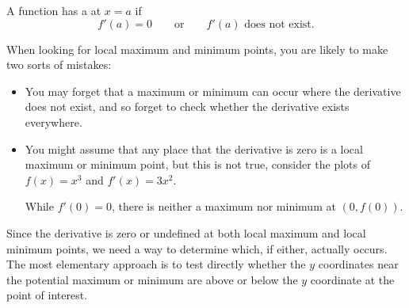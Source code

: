 \documentclass{ximera}
\begin{document}
\begin{definition}
  A function has a  at $x=a$ if 
  \[
  f'(a) = 0\qquad\text{or}\qquad \text{$f'(a)$ does not exist.}
  \]
\end{definition}

\begin{warning} 
When looking for local maximum and minimum points, you are likely to
make two sorts of mistakes: 
\begin{itemize}
\item You may forget that a maximum or minimum can occur where the
  derivative does not exist, and so forget to check whether the
  derivative exists everywhere. 
\item You might assume that any place that the derivative is zero is a
  local maximum or minimum point, but this is not true, consider the
  plots of $f(x) = x^3$ and $f'(x) = 3x^2$.
\begin{image}
\end{image}
While $f'(0)=0$, there is neither a maximum nor minimum at $(0,f(0))$.
\end{itemize}
\end{warning}



Since the derivative is zero or undefined at both local maximum and
local minimum points, we need a way to determine which, if either,
actually occurs. The most elementary approach is to test directly
whether the $y$ coordinates near the potential maximum or minimum are
above or below the $y$ coordinate at the point of interest. 
\end{document}
